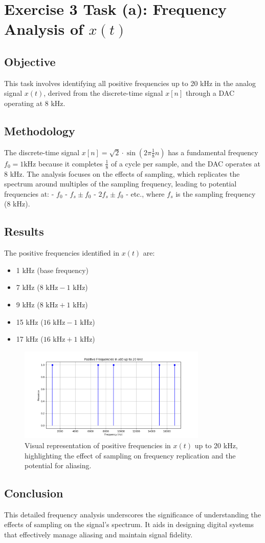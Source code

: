 \item[(a)]
\section*{Exercise 3 Task (a): Frequency Analysis of \(x(t)\)}

\subsection*{Objective}
This task involves identifying all positive frequencies up to 20 kHz in the analog signal \(x(t)\), derived from the discrete-time signal \(x[n]\) through a DAC operating at 8 kHz.

\subsection*{Methodology}
The discrete-time signal \(x[n] = \sqrt{2} \cdot \sin\left(2\pi \frac{1}{8} n\right)\) has a fundamental frequency \(f_0 = 1 \text{kHz}\) because it completes \(\frac{1}{8}\) of a cycle per sample, and the DAC operates at 8 kHz. The analysis focuses on the effects of sampling, which replicates the spectrum around multiples of the sampling frequency, leading to potential frequencies at:
- \(f_0\)
- \(f_s \pm f_0\)
- \(2f_s \pm f_0\)
- etc., where \(f_s\) is the sampling frequency (8 kHz).

\subsection*{Results}
The positive frequencies identified in \(x(t)\) are:
\begin{itemize}
\item 1 kHz (base frequency)
\item 7 kHz (\(8 \text{ kHz} - 1 \text{ kHz}\))
\item 9 kHz (\(8 \text{ kHz} + 1 \text{ kHz}\))
\item 15 kHz (\(16 \text{ kHz} - 1 \text{ kHz}\))
\item 17 kHz (\(16 \text{ kHz} + 1 \text{ kHz}\))
\end{itemize}

\begin{figure}[h]
    \centering
    \includegraphics[width=0.8\textwidth]{fig/ex3_task_a_frequencies.png}
    \caption{Visual representation of positive frequencies in \(x(t)\) up to 20 kHz, highlighting the effect of sampling on frequency replication and the potential for aliasing.}
    \label{fig:exercise3a_frequencies}
\end{figure}

\subsection*{Conclusion}
This detailed frequency analysis underscores the significance of understanding the effects of sampling on the signal's spectrum. It aids in designing digital systems that effectively manage aliasing and maintain signal fidelity.
